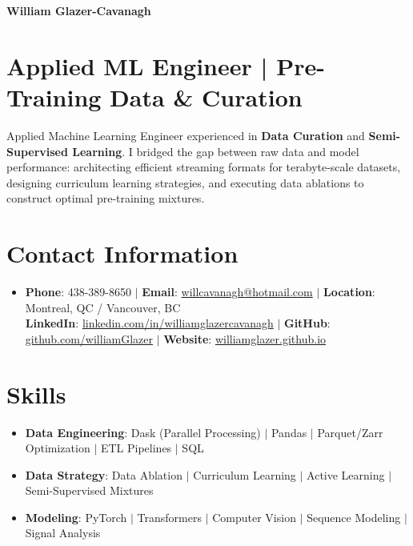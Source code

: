 \documentclass[letterpaper,10pt]{article}
\newcommand{\resumeItem}[1]{\item\small{#1}}
\begin{document}
\begin{center}
  \textbf{\Huge William Glazer-Cavanagh} \\
\end{center}

\section*{Applied ML Engineer | Pre-Training Data \& Curation}
Applied Machine Learning Engineer experienced in \textbf{Data Curation} and \textbf{Semi-Supervised Learning}. I bridged the gap between raw data and model performance: architecting efficient streaming formats for terabyte-scale datasets, designing curriculum learning strategies, and executing data ablations to construct optimal pre-training mixtures.

\section{Contact Information}
\vspace{-6pt}
\begin{itemize}[leftmargin=0.15in, label={}, itemsep=-3pt]
  \resumeItem{
    \textbf{Phone}: 438-389-8650 
    $|$ \textbf{Email}: \href{mailto:willcavanagh@hotmail.com}{willcavanagh@hotmail.com} 
    $|$ \textbf{Location}: Montreal, QC / Vancouver, BC
    \\
    \textbf{LinkedIn}: \href{https://www.linkedin.com/in/williamglazercavanagh/}{linkedin.com/in/williamglazercavanagh}
    $|$ \textbf{GitHub}: \href{https://github.com/williamGlazer}{github.com/williamGlazer} 
    $|$ \textbf{Website}: \href{https://williamglazer.github.io}{williamglazer.github.io}
  }
\end{itemize}

\section{Skills}
\vspace{-6pt}
\begin{itemize}[leftmargin=0.15in, label={}, itemsep=-3pt]
  \resumeItem{\textbf{Data Engineering}: Dask (Parallel Processing) $|$ Pandas $|$ Parquet/Zarr Optimization $|$ ETL Pipelines $|$ SQL}
  \resumeItem{\textbf{Data Strategy}: Data Ablation $|$ Curriculum Learning $|$ Active Learning $|$ Semi-Supervised Mixtures}
  \resumeItem{\textbf{Modeling}: PyTorch $|$ Transformers $|$ Computer Vision $|$ Sequence Modeling $|$ Signal Analysis}
\end{itemize}
\end{document}

